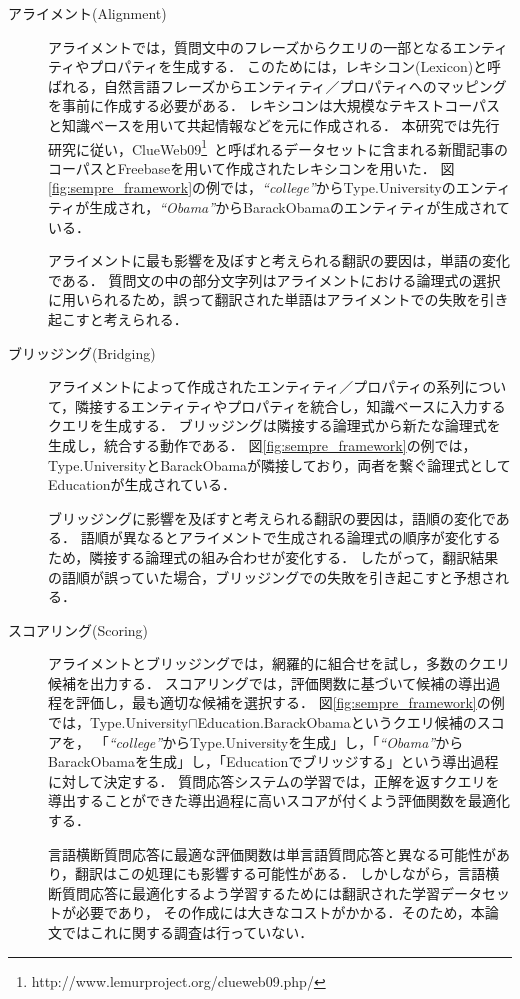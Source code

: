 \documentclass[japanese]{jnlp_1.4}
\begin{document}
\begin{description}
\item[アライメント(Alignment)]
アライメントでは，質問文中のフレーズからクエリの一部となるエンティティやプロパティを生成する．
このためには，レキシコン(Lexicon)と呼ばれる，自然言語フレーズからエンティティ／プロパティへのマッピングを事前に作成する必要がある．
レキシコンは大規模なテキストコーパスと知識ベースを用いて共起情報などを元に作成される．
本研究では先行研究\cite{berant2013}に従い，ClueWeb09\footnote{http://www.lemurproject.org/clueweb09.php/}~\cite{clueweb09}と呼ばれるデータセットに含まれる新聞記事のコーパスとFreebaseを用いて作成されたレキシコンを用いた．
図\ref{fig:sempre_framework}の例では，{\it ``college''}からType.Universityのエンティティが生成され，{\it ``Obama''}からBarackObamaのエンティティが生成されている．

アライメントに最も影響を及ぼすと考えられる翻訳の要因は，単語の変化である．
質問文の中の部分文字列はアライメントにおける論理式の選択に用いられるため，誤って翻訳された単語はアライメントでの失敗を引き起こすと考えられる．

\item[ブリッジング(Bridging)]
アライメントによって作成されたエンティティ／プロパティの系列について，隣接するエンティティやプロパティを統合し，知識ベースに入力するクエリを生成する．
ブリッジングは隣接する論理式から新たな論理式を生成し，統合する動作である．
図\ref{fig:sempre_framework}の例では，Type.UniversityとBarackObamaが隣接しており，両者を繋ぐ論理式としてEducationが生成されている．

ブリッジングに影響を及ぼすと考えられる翻訳の要因は，語順の変化である．
語順が異なるとアライメントで生成される論理式の順序が変化するため，隣接する論理式の組み合わせが変化する．
したがって，翻訳結果の語順が誤っていた場合，ブリッジングでの失敗を引き起こすと予想される．

\item[スコアリング(Scoring)]
アライメントとブリッジングでは，網羅的に組合せを試し，多数のクエリ候補を出力する．
スコアリングでは，評価関数に基づいて候補の導出過程を評価し，最も適切な候補を選択する．
図\ref{fig:sempre_framework}の例では，Type.University$\sqcap$Education.BarackObamaというクエリ候補のスコアを，
「{\it ``college''}からType.Universityを生成」し，「{\it ``Obama''}からBarackObamaを生成」し，「Educationでブリッジする」という導出過程に対して決定する．
質問応答システムの学習では，正解を返すクエリを導出することができた導出過程に高いスコアが付くよう評価関数を最適化する．

言語横断質問応答に最適な評価関数は単言語質問応答と異なる可能性があり，翻訳はこの処理にも影響する可能性がある．
しかしながら，言語横断質問応答に最適化するよう学習するためには翻訳された学習データセットが必要であり，
その作成には大きなコストがかかる．そのため，本論文ではこれに関する調査は行っていない．
\end{description}
\end{document}
